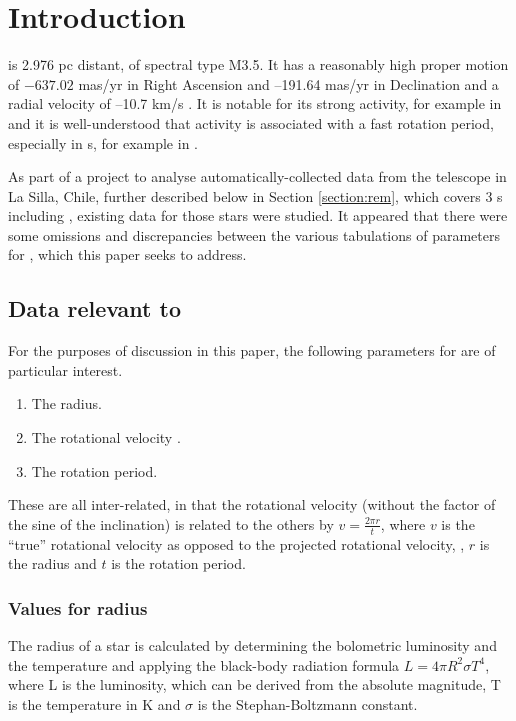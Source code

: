 \section{Introduction}
\protect\label{section:intro}

{\ross} is 2.976 pc distant, of spectral type M3.5. It has a reasonably high
proper motion of $-637.02$ mas/yr in Right Ascension and  {–}191.64 mas/yr
in Declination and a radial velocity of {–}10.7 km/s \citep{vanleeuwen07}. It is
notable for its strong activity, for example in \citet{wargelin08} and it is
well-understood that activity is associated with a fast rotation period,
especially in \rdwarf s, for example in \citet{mohanty03}.

As part of a project to analyse automatically-collected data from the {\rem}
telescope in La Silla, Chile, further described below in Section
\ref{section:rem}, which covers 3 \rdwarf s including \ross, existing data for
those stars were studied. It appeared that there were some omissions and
discrepancies between the various tabulations of parameters for \ross, which
this paper seeks to address.

\subsection{Data relevant to \ross}

For the purposes of discussion in this paper, the following parameters for
{\ross} are of particular interest.

\begin{enumerate}
  \item The radius.
  \item The rotational velocity \vsini.
  \item The rotation period.
\end{enumerate}

These are all inter-related, in that the rotational velocity (without the factor of
the sine of the inclination) is related to the others by $v = \frac{2 \pi
r}{t}$, where $v$ is the ``true'' rotational velocity as opposed to the
projected rotational velocity, \vsini, $r$ is the radius and $t$ is the rotation
period.

\subsubsection{Values for radius}

The radius of a star is calculated by determining the bolometric luminosity and
the temperature and applying the black-body radiation formula $L = 4 \pi R^2
\sigma T^4$, where L is the luminosity, which can be derived from the absolute
magnitude, T is the temperature in {\degree}K and $\sigma$ is the
Stephan-Boltzmann constant.

